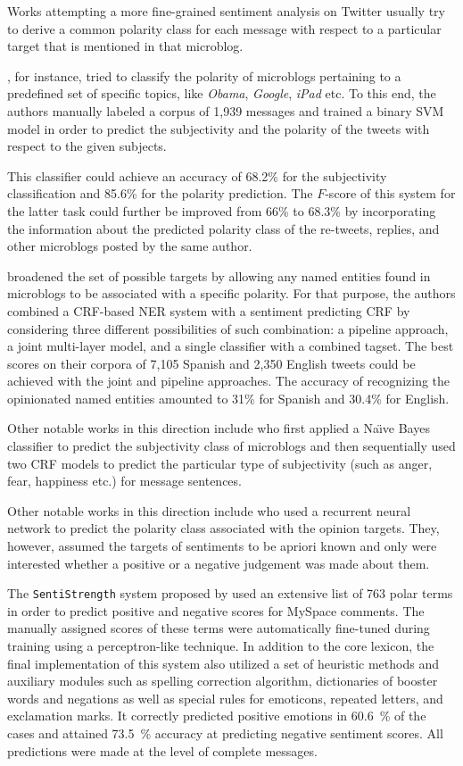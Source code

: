 Works attempting a more fine-grained sentiment analysis on Twitter
usually try to derive a common polarity class for each message with
respect to a particular target that is mentioned in that microblog.

\citet{Jiang:11}, for instance, tried to classify the polarity of
microblogs pertaining to a predefined set of specific topics, like
\emph{Obama}, \emph{Google}, \emph{iPad} etc.  To this end, the
authors manually labeled a corpus of 1,939 messages and trained a
binary SVM model in order to predict the subjectivity and the polarity
of the tweets with respect to the given subjects.

This classifier could achieve an accuracy of 68.2\% for the
subjectivity classification and 85.6\% for the polarity prediction.
The $F$-score of this system for the latter task could further be
improved from 66\% to 68.3\% by incorporating the information about
the predicted polarity class of the re-tweets, replies, and other
microblogs posted by the same author.

\citet{Mitchell:13} broadened the set of possible targets by allowing
any named entities found in microblogs to be associated with a
specific polarity.  For that purpose, the authors combined a CRF-based
NER system with a sentiment predicting CRF by considering three
different possibilities of such combination: a pipeline approach, a
joint multi-layer model, and a single classifier with a combined
tagset.  The best scores on their corpora of 7,105 Spanish and 2,350
English tweets could be achieved with the joint and pipeline
approaches.  The accuracy of recognizing the opinionated named
entities amounted to 31\% for Spanish and 30.4\% for English.

Other notable works in this direction include \citet{Chunping:14} who
first applied a Na\"{\i}ve Bayes classifier to predict the
subjectivity class of microblogs and then sequentially used two CRF
models to predict the particular type of subjectivity (such as anger,
fear, happiness etc.) for message sentences.

Other notable works in this direction include \citet{Dong:14} who used
a recurrent neural network to predict the polarity class associated
with the opinion targets.  They, however, assumed the targets of
sentiments to be apriori known and only were interested whether a
positive or a negative judgement was made about them.

\citet{Derks:08}

The \texttt{SentiStrength} system proposed by \cite{Thelwall:12} used
an extensive list of 763 polar terms in order to predict positive and
negative scores for MySpace comments.  The manually assigned scores of
these terms were automatically fine-tuned during training using a
perceptron-like technique.  In addition to the core lexicon, the final
implementation of this system also utilized a set of heuristic methods
and auxiliary modules such as spelling correction algorithm,
dictionaries of booster words and negations as well as special rules
for emoticons, repeated letters, and exclamation marks.  It correctly
predicted positive emotions in 60.6~\% of the cases and attained
73.5~\% accuracy at predicting negative sentiment scores.  All
predictions were made at the level of complete messages.


